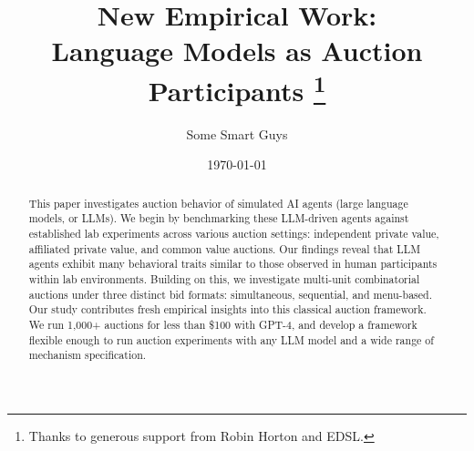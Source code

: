 \documentclass{article} %
\title{\vspace*{-1cm} New Empirical Work: \\ Language Models as Auction Participants \thanks{
  \footnotesize
  Thanks to generous support from Robin Horton and EDSL.
}
}
\author{Some Smart Guys}
\date{\today}
\begin{document}
\maketitle

\begin{abstract}
\noindent This paper investigates auction behavior of simulated AI agents (large language models, or LLMs). 
We begin by benchmarking these LLM-driven agents against established lab experiments across various auction settings: independent private value, affiliated private value, and common value auctions. 
Our findings reveal that LLM agents exhibit many behavioral traits similar to those observed in human participants within lab environments.
Building on this, we investigate multi-unit combinatorial auctions under three distinct bid formats: simultaneous, sequential, and menu-based. 
Our study contributes fresh empirical insights into this classical auction framework.
We run 1,000+ auctions for less than \$100 with GPT-4, and develop a framework flexible enough to run auction experiments with any LLM model and a wide range of mechanism  specification. 

\end{abstract}
\end{document}
